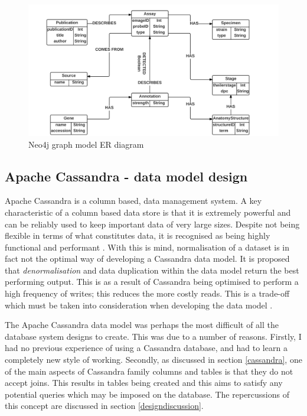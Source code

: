 \begin{figure}[H]\begin{center}\includegraphics[width=1\linewidth]{images/neo4j_model_er}\caption{Neo4j graph model ER diagram}\label{fig:neo1}\end{center}\end{figure}
\newpage
\subsection{Apache Cassandra  - data model design}
Apache Cassandra is a column based, data management system. A key characteristic of a column based data store is that it is extremely powerful and can be reliably used to keep important data of very large sizes. Despite not being flexible in terms of what constitutes data, it is recognised as being highly functional and performant \cite{cassandra}. With this is mind, normalisation of a dataset is in fact not the optimal way of developing a Cassandra data model. It is proposed that \textit{denormalisation} and data duplication within the data model return the best performing output. This is as a result of Cassandra being optimised to perform a high frequency of writes; this reduces the more costly reads. This is a trade-off which must be taken into consideration when developing the data model \cite{cassandra}.

The Apache Cassandra data model was perhaps the most difficult of all the database system designs to create. This was due to a number of reasons. Firstly, I had no previous experience of using a Cassandra database, and had to learn a completely new style of working. Secondly, as discussed in section \ref{cassandra}, one of the main aspects of Cassandra family columns and tables is that they do not accept joins. This results in tables being created and this aims to satisfy any potential queries which may be imposed on the database. The repercussions of this concept are discussed in section \ref{designdiscussion}.

